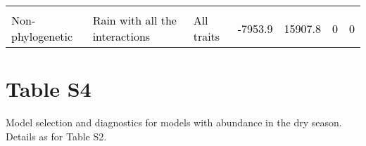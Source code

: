 \documentclass[
  12pt,
  letterpaper,
  DIV=11,
  numbers=noendperiod]{scrartcl}
\begin{document}
\begin{table}[H]
{\begin{tabular}[t]{lllllll}
\cellcolor{gray!6}{\textcolor{black}{Phylogenetic}} & \cellcolor{gray!6}{\textcolor{black}{Rain with all the interactions}} & \cellcolor{gray!6}{\textcolor{black}{All traits}} & \cellcolor{gray!6}{\textcolor{black}{-7953.4}} & \cellcolor{gray!6}{\textcolor{black}{15906.7}} & \cellcolor{gray!6}{\textcolor{black}{0}} & \cellcolor{gray!6}{\textcolor{black}{0}}\\
\textcolor{black}{Non-phylogenetic} & \textcolor{black}{Rain with all the interactions} & \textcolor{black}{All traits} & \textcolor{black}{-7953.9} & \textcolor{black}{15907.8} & \textcolor{black}{0} & \textcolor{black}{0}\\
\bottomrule
\end{tabular}}
\end{table}

\newpage

\hypertarget{table-s4}{%
\section{Table S4}\label{table-s4}}

Model selection and diagnostics for models with abundance in the dry
season. Details as for Table S2.
\end{document}
